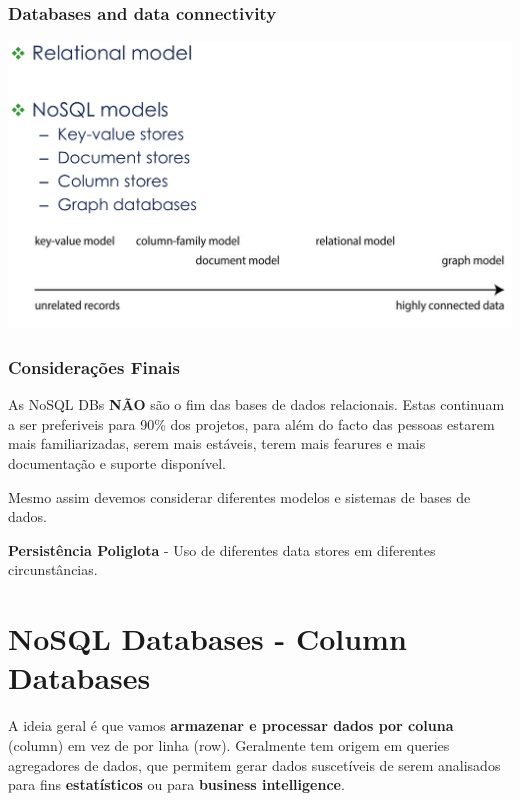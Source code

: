 \documentclass{article}
\begin{document}
\subsubsection{Databases and data connectivity}

\begin{center}
  \includegraphics[scale=0.25]{41}
\end{center}

\pagebreak

\subsubsection{Considerações Finais}

As NoSQL DBs \textbf{NÃO} são o fim das bases de dados relacionais.
Estas continuam a ser preferiveis para 90\% dos projetos, para além do facto
das pessoas estarem mais familiarizadas, serem mais estáveis, terem mais
fearures e mais documentação e suporte disponível.

Mesmo assim devemos considerar diferentes modelos e sistemas de bases de dados.

\vspace{2mm}

\begin{flushleft}
  \textbf{Persistência Poliglota} - Uso de diferentes data stores em diferentes circunstâncias.
\end{flushleft}






\pagebreak
\section{NoSQL Databases - Column Databases}

A ideia geral é que vamos \textbf{armazenar e processar dados por coluna} (column) em vez de por linha
(row). Geralmente tem origem em queries agregadores de dados, que permitem gerar
dados suscetíveis de serem analisados para fins \textbf{estatísticos} ou para \textbf{business intelligence}.
\end{document}
